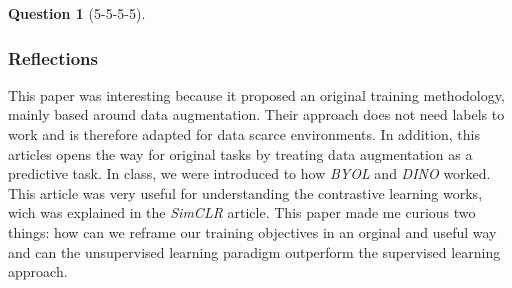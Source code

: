 \documentclass[12pt]{article}
\theoremstyle{definition}
\newtheorem{exercise}{Question}%
\begin{document}
\begin{exercise}[5-5-5-5]
{  \subsubsection*{Reflections}

    This paper was interesting because it proposed an original training
    methodology, mainly based around data augmentation. Their approach does not need
    labels to work and is therefore adapted for data scarce environments.  In
    addition, this articles opens the way for original tasks by treating data
    augmentation as a predictive task. In class, we were introduced to how
    \emph{BYOL} and \emph{DINO} worked. This article was very useful for
    understanding the contrastive learning works, wich was explained in the
    \emph{SimCLR} article. This paper made me curious two things: how can we
    reframe our training objectives in an orginal and useful way and can the
    unsupervised learning paradigm outperform the supervised learning approach.
}
\end{exercise}
\end{document}
